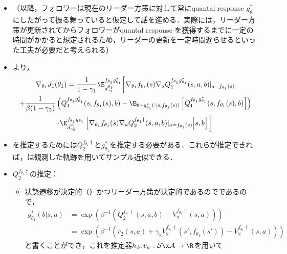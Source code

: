 \documentclass[a4paper,10pt,dvipdfmx]{jsarticle}
\begin{document}
\begin{itemize}
    \item （以降，フォロワーは現在のリーダー方策に対して常にquantal response $g_{\theta_1}^*$にしたがって振る舞っていると仮定して話を進める．実際には，リーダー方策が更新されてからフォロワーがquantal response を獲得するまでに一定の時間がかかると想定されるため，リーダーの更新を一定時間遅らせるといった工夫が必要だと考えられる）
    \item {}より，
    \begin{multline}
        \nabla_{\theta_1}J_1(\theta_1)
        =\dfrac{1}{1-\gamma_1}\E_{d_{\gamma_1}^{\theta_1}}^{f_{\theta_1}g_{\theta_1}^*}\bigg[\nabla_{\theta_1}f_{\theta_1}(s)\nabla_{a}Q_1^{f_{\theta_1}g_{\theta_1}^*}(s,a,b)|_{a=f_{\theta_1}(s)}\\
        +\dfrac{1}{\beta(1-\gamma_2)}\left(Q_1^{f_{\theta_1}g_{\theta_1}^*}(s,f_{\theta_1}(s),b)-\E_{b\sim g_{\theta_1}^*(\cdot|s,f_{\theta_1}(s))}\left[Q_1^{f_{\theta_1}g_{\theta_1}^*}(s,f_{\theta_1}(s),b)\right]\right)\\
        \cdot\E_{d_{\gamma_2}^{\theta_1}}^{f_{\theta_1}g_{\theta_1}}\left[\nabla_{\theta_1}f_{\theta_1}(\dot{s})\nabla_{a}Q_2^{f_{\theta_1}\dag}(\dot{s},a,\dot{b})|_{a=f_{\theta_1}(\dot{s})}\middle|s,b\right]\bigg]\label{eq:SPG_qr_bbf_det}
    \end{multline}
    \item {}を推定するためには$Q_2^{f_{\theta_1}\dag}$と$g_{\theta_1}^*$を推定する必要がある．これらが推定できれば，は観測した軌跡を用いてサンプル近似できる．
    \item $Q_2^{f_{\theta_1}\dag}$の推定：
    \begin{itemize}
        \item 状態遷移が決定的（）かつリーダー方策が決定的であるのでであるので，
        \begin{subequations}
        \begin{align}
            g_{\theta_1}^*(b|s,a)&=\exp\left(\beta^{-1}\left(Q_2^{f_{\theta_1}\dag}(s,a,b)-V_2^{f_{\theta_1}\dag}(s,a)\right)\right)\\
            &=\exp\left(\beta^{-1}\left(r_2(s,a)+\gamma_2V_2^{f_{\theta_1}\dag}(s',f_{\theta_1}(s'))-V_2^{f_{\theta_1}\dag}(s,a)\right)\right)
        \end{align}
        \end{subequations}
        と書くことができ，これを推定器$h_{\phi},v_{\psi}:\mathcal{S}\x\mathcal{A}\to\R$を用いて

\end{itemize}
\end{itemize}
\end{document}
